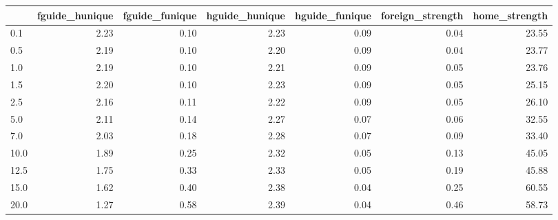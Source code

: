\begin{tabular}{lrrrrrr}
\toprule
 & fguide_hunique & fguide_funique & hguide_hunique & hguide_funique & foreign_strength & home_strength \\
\midrule
0.1 & 2.23 & 0.10 & 2.23 & 0.09 & 0.04 & 23.55 \\
0.5 & 2.19 & 0.10 & 2.20 & 0.09 & 0.04 & 23.77 \\
1.0 & 2.19 & 0.10 & 2.21 & 0.09 & 0.05 & 23.76 \\
1.5 & 2.20 & 0.10 & 2.23 & 0.09 & 0.05 & 25.15 \\
2.5 & 2.16 & 0.11 & 2.22 & 0.09 & 0.05 & 26.10 \\
5.0 & 2.11 & 0.14 & 2.27 & 0.07 & 0.06 & 32.55 \\
7.0 & 2.03 & 0.18 & 2.28 & 0.07 & 0.09 & 33.40 \\
10.0 & 1.89 & 0.25 & 2.32 & 0.05 & 0.13 & 45.05 \\
12.5 & 1.75 & 0.33 & 2.33 & 0.05 & 0.19 & 45.88 \\
15.0 & 1.62 & 0.40 & 2.38 & 0.04 & 0.25 & 60.55 \\
20.0 & 1.27 & 0.58 & 2.39 & 0.04 & 0.46 & 58.73 \\
\bottomrule
\end{tabular}
